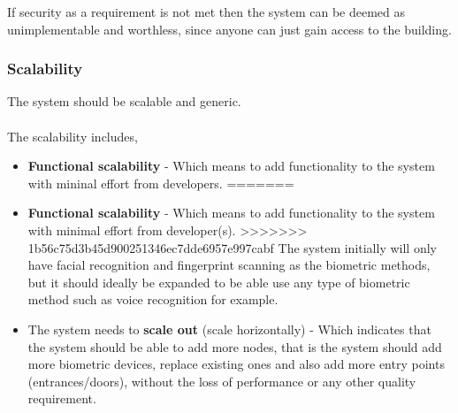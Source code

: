 If security as a requirement is not met then the system can be deemed as unimplementable and worthless, since anyone can just gain access to the building.

\subsubsection{Scalability}
The system should be scalable and generic.\\
\\The scalability includes,
\begin{itemize}
<<<<<<< HEAD
	\item  \textbf{Functional scalability} - Which means to add functionality to the system with mininal effort from developers.
=======
	\item  \textbf{Functional scalability} - Which means to add functionality to the system with minimal effort from developer(s).
>>>>>>> 1b56c75d3b45d900251346ec7dde6957e997cabf
		The system initially will only have facial recognition and fingerprint scanning as the biometric methods, but it should ideally be expanded to be able use any type of biometric method such as voice recognition for example.
	\item  The system needs to \textbf{scale out} (scale horizontally) - Which indicates that the system should be able to add more nodes, that 		is the system should add more biometric devices, replace existing ones and also add more entry points (entrances/doors), 			without the loss of performance or any other quality requirement.
\end{itemize}





